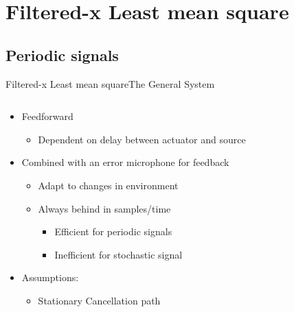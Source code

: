 \section{Filtered-x Least mean square}


\subsection{Periodic signals}
\begin{frame}{Filtered-x Least mean square}{The General System}
	\begin{columns}
		\begin{column}{0.5\textwidth}		

		\begin{itemize}
		\item Feedforward
		\begin{itemize}
		\item Dependent on delay between actuator and source		
		\end{itemize}
		\item Combined with an error microphone for feedback
		\begin{itemize}
		\item Adapt to changes in environment
		\item Always behind in samples/time 		
		\begin{itemize}
		\item Efficient for periodic signals
		\item Inefficient for stochastic signal 
		\end{itemize}	
		\end{itemize}
		\item Assumptions:
		\begin{itemize}
		\item Stationary Cancellation path
		\end{itemize}

		\end{itemize}

		
		\end{column}
		\begin{column}{0.5\textwidth}
		\resizebox{1.1\columnwidth}{!}{	
		
		}
		\end{column}
	\end{columns}
\end{frame}

